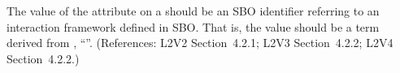 The value of the  attribute on a \Model should be
an SBO identifier referring to an interaction framework defined
in SBO.  That is, the value should be a term derived from
\sbointeractionID, ``''.  (References: L2V2
Section~4.2.1; L2V3 Section~4.2.2; L2V4 Section~4.2.2.)
